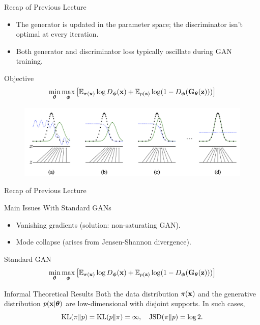 \documentclass{beamer}
\begin{document}
\begin{frame}{Recap of Previous Lecture}
	\begin{itemize}
		\item The generator is updated in the parameter space; the discriminator isn't optimal at every iteration.
		\item Both generator and discriminator loss typically oscillate during GAN training.
	\end{itemize}
	\begin{block}{Objective}
		\vspace{-0.5cm}
		\[
		\min_{\boldsymbol{\theta}} \max_{\boldsymbol{\phi}} \left[ \mathbb{E}_{\pi(\mathbf{x})} \log D_{\boldsymbol{\phi}}(\mathbf{x}) + \mathbb{E}_{p(\mathbf{z})} \log (1 - D_{\boldsymbol{\phi}}(\mathbf{G}_{\boldsymbol{\theta}}(\mathbf{z}))) \right]
		\]
		\vspace{-0.5cm}
	\end{block}
	\begin{figure}
		\centering
		\includegraphics[width=1.0\linewidth]{figs/gan_1}
	\end{figure}
\end{frame}
\begin{frame}{Recap of Previous Lecture}
	\begin{block}{Main Issues With Standard GANs}
		\begin{itemize}
			\item Vanishing gradients (solution: non-saturating GAN).
			\item Mode collapse (arises from Jensen-Shannon divergence).
		\end{itemize}
	\end{block}
	\begin{block}{Standard GAN}
		\vspace{-0.2cm}
		\[
		\min_{\boldsymbol{\theta}} \max_{\boldsymbol{\phi}} \left[ \mathbb{E}_{\pi(\mathbf{x})} \log D_{\boldsymbol{\phi}}(\mathbf{x}) + \mathbb{E}_{p(\mathbf{z})} \log (1 - D_{\boldsymbol{\phi}}(\mathbf{G}_{\boldsymbol{\theta}}(\mathbf{z}))) \right]
		\]
		\vspace{-0.4cm}
	\end{block}
	\vspace{-0.1cm}
	\begin{block}{Informal Theoretical Results}
		Both the data distribution $\pi(\mathbf{x})$ and the generative distribution $p(\mathbf{x} | \boldsymbol{\theta})$ are low-dimensional with disjoint supports. In such cases,
		\[
			\mathrm{KL}(\pi \| p) = \mathrm{KL}(p \| \pi) = \infty, \quad \mathrm{JSD}(\pi \| p) = \log 2.
		\]
	\end{block}
\end{frame}
\end{document}
